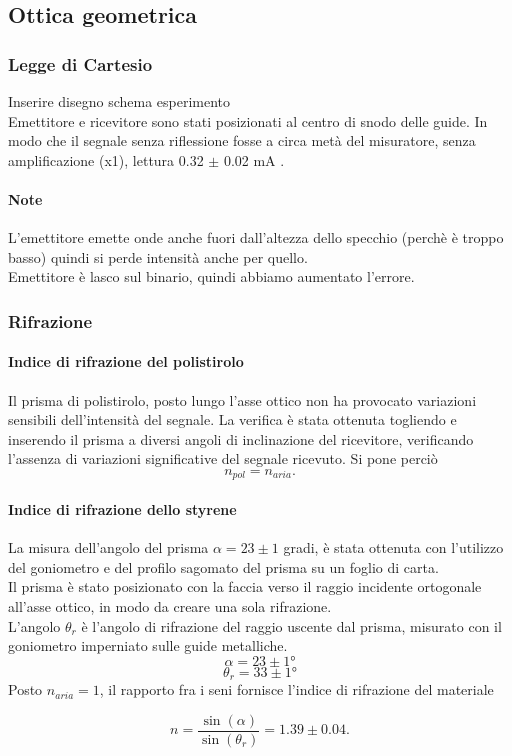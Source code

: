 \subsection{Ottica geometrica}
    \subsubsection{Legge di Cartesio}
        Inserire disegno schema esperimento\\
        Emettitore e ricevitore sono stati posizionati al centro di snodo delle guide. In modo che il segnale senza riflessione fosse a circa metà del misuratore, senza amplificazione (x1), lettura 0.32 $\pm$ 0.02 mA .
        
        \paragraph{Note}{ L'emettitore emette onde anche fuori dall'altezza dello specchio (perchè è troppo basso) quindi si perde intensità anche per quello.\\
        Emettitore è lasco sul binario, quindi abbiamo aumentato l'errore.}
%
%
%
    \subsubsection{Rifrazione}
%
        \paragraph{ Indice di rifrazione del polistirolo}
        Il prisma di polistirolo, posto lungo l'asse ottico non ha provocato variazioni sensibili dell'intensità del segnale. La verifica è stata ottenuta togliendo e inserendo il prisma a diversi angoli di inclinazione del ricevitore, verificando l'assenza di variazioni significative del segnale ricevuto. Si pone perciò
%
            \[  n_{pol} = n_{aria}.  \]
%
        \paragraph{ Indice di rifrazione dello styrene }
        La misura dell'angolo del prisma $ \alpha = 23 \pm 1 $ gradi, è stata ottenuta con l'utilizzo del goniometro e del profilo sagomato del prisma su un foglio di carta.\\
%
        Il prisma è stato posizionato con la faccia verso il raggio incidente ortogonale all'asse ottico, in modo da creare una sola rifrazione.\\
%
        L'angolo $ \theta_{r} $ è l'angolo di rifrazione del raggio uscente dal prisma, misurato con il goniometro imperniato sulle guide metalliche.\\
            $$ \alpha = 23 \pm 1 \mathrm{°}$$ 
            $$ \theta_r =  33 \pm 1 ° $$
%        
        Posto $ n_{aria} = 1 $, il rapporto fra i seni fornisce l'indice di rifrazione del materiale
    
            $$ n = \frac{\sin( \alpha )}{ \sin( \theta_{r} ) } = 1.39 \pm 0.04. $$ 
